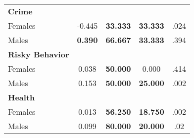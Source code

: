 \begin{tabular}{l c c c c}
\midrule
\textbf{Crime} & & & & \\
\quad Females &     -0.445 & \textbf{   33.333} & \textbf{   33.333} & .024 \\
\quad Males &  \textbf{    0.390} & \textbf{   66.667} & \textbf{   33.333} & .394 \\
\midrule
\textbf{Risky Behavior} & & & & \\
\quad Females &      0.038 & \textbf{   50.000} &     0.000 & .414 \\
\quad Males &      0.153 & \textbf{   50.000} & \textbf{   25.000} & .002 \\
\midrule
\textbf{Health} & & & & \\
\quad Females &      0.013 & \textbf{   56.250} & \textbf{   18.750} & .002 \\
\quad Males &      0.099 & \textbf{   80.000} & \textbf{   20.000} & .02 \\
\bottomrule
\end{tabular}
